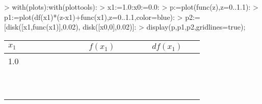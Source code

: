 \begin{MapleInput}
> with(plots):with(plottools): 
> x1:=1.0:x0:=0.0: 
> p:=plot(func(z),z=0..1.1):
> p1:=plot(df(x1)*(z-x1)+func(x1),z=0..1.1,color=blue):
> p2:=[disk([x1,func(x1)],0.02), disk([x0,0],0.02)]:
> display(p,p1,p2,gridlines=true);
\end{MapleInput}

\begin{table}[h]\begin{center}\begin{tabular}{|l|c|c|}
\hline
$x_1$ &$f(x_1)$ & $df(x_1)$ \\ \hline
1.0　& 　　　　 & 　　　　\\  \hline
　　　　　　　& 　　　　　　　 & 　　　　　　　\\  \hline
　　　　　　　& 　　　　　　　 & 　　　　　　　\\  \hline
\end{tabular}\end{center}\label{default}\end{table}%

